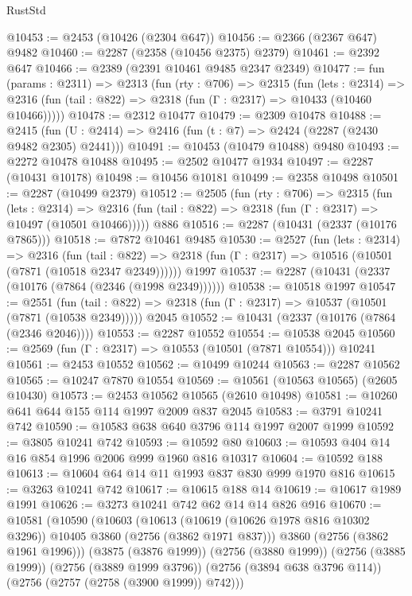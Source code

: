 \begin{lexlean}{RustStd}
\begin{coremodule}
@10453 := @2453 (@10426 (@2304 @647))
@10456 := @2366 (@2367 @647) @9482
@10460 := @2287 (@2358 (@10456 @2375) @2379)
@10461 := @2392 @647
@10466 := @2389 (@2391 @10461 @9485 @2347 @2349)
@10477 := fun (params : @2311) =>
  @2313
    (fun (rty : @706) =>
    @2315
      (fun (lets : @2314) =>
      @2316 (fun (tail : @822) => @2318 (fun (Γ : @2317) => @10433 (@10460 @10466)))))
@10478 := @2312 @10477
@10479 := @2309 @10478
@10488 := @2415 (fun (U : @2414) => @2416 (fun (t : @7) => @2424 (@2287 (@2430 @9482 @2305) @2441)))
@10491 := @10453 (@10479 @10488) @9480
@10493 := @2272 @10478 @10488
@10495 := @2502 @10477 @1934
@10497 := @2287 (@10431 @10178)
@10498 := @10456 @10181
@10499 := @2358 @10498
@10501 := @2287 (@10499 @2379)
@10512 := @2505
    (fun (rty : @706) =>
    @2315
      (fun (lets : @2314) =>
      @2316 (fun (tail : @822) => @2318 (fun (Γ : @2317) => @10497 (@10501 @10466)))))
    @886
@10516 := @2287 (@10431 (@2337 (@10176 @7865)))
@10518 := @7872 @10461 @9485
@10530 := @2527
    (fun (lets : @2314) =>
    @2316
      (fun (tail : @822) =>
      @2318 (fun (Γ : @2317) => @10516 (@10501 (@7871 (@10518 @2347 @2349))))))
    @1997
@10537 := @2287 (@10431 (@2337 (@10176 (@7864 (@2346 (@1998 @2349))))))
@10538 := @10518 @1997
@10547 := @2551
    (fun (tail : @822) => @2318 (fun (Γ : @2317) => @10537 (@10501 (@7871 (@10538 @2349)))))
    @2045
@10552 := @10431 (@2337 (@10176 (@7864 (@2346 @2046))))
@10553 := @2287 @10552
@10554 := @10538 @2045
@10560 := @2569 (fun (Γ : @2317) => @10553 (@10501 (@7871 @10554))) @10241
@10561 := @2453 @10552
@10562 := @10499 @10244
@10563 := @2287 @10562
@10565 := @10247 @7870 @10554
@10569 := @10561 (@10563 @10565) (@2605 @10430)
@10573 := @2453 @10562 @10565 (@2610 @10498)
@10581 := @10260 @641 @644 @155 @114 @1997 @2009 @837 @2045
@10583 := @3791 @10241 @742
@10590 := @10583 @638 @640 @3796 @114 @1997 @2007 @1999
@10592 := @3805 @10241 @742
@10593 := @10592 @80
@10603 := @10593 @404 @14 @16 @854 @1996 @2006 @999 @1960 @816 @10317
@10604 := @10592 @188
@10613 := @10604 @64 @14 @11 @1993 @837 @830 @999 @1970 @816
@10615 := @3263 @10241 @742
@10617 := @10615 @188 @14
@10619 := @10617 @1989 @1991
@10626 := @3273 @10241 @742 @62 @14 @14 @826 @916
@10670 := @10581
    (@10590
      (@10603
        (@10613 (@10619 (@10626 @1978 @816 @10302 @3296)) @10405 @3860 (@2756 (@3862 @1971 @837)))
        @3860
        (@2756 (@3862 @1961 @1996)))
      (@3875 (@3876 @1999))
      (@2756 (@3880 @1999))
      (@2756 (@3885 @1999))
      (@2756 (@3889 @1999 @3796))
      (@2756 (@3894 @638 @3796 @114))
      (@2756 (@2757 (@2758 (@3900 @1999)) @742)))

\end{coremodule}
\end{lexlean}
